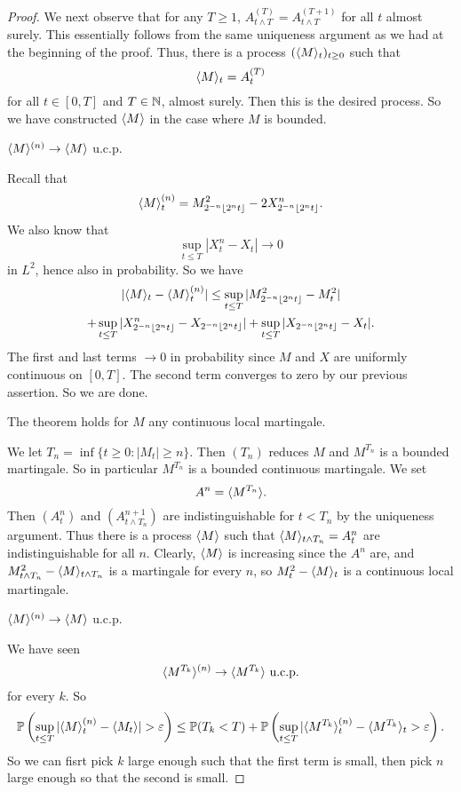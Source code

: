\documentclass[a4paper]{article}
\begin{document}
\begin{proof}
  We next observe that for any $T \geq 1$, $A_{t \wedge T}^{(T)} = A_{t \wedge T}^{(T + 1)}$ for all $t$ almost surely. This essentially follows from the same uniqueness argument as we had at the beginning of the proof. Thus, there is a process $(\langle M\rangle_t)_{t \geq 0}$ such that
  \[
    \langle M\rangle_t = A_t^{(T)}
  \]
  for all $t \in [0, T]$ and $T \in \mathbb{N}$, almost surely. Then this is the desired process. So we have constructed $\langle M\rangle$ in the case where $M$ is bounded.

  \begin{claim}
    $\langle M\rangle^{(n)} \to \langle M\rangle$ u.c.p.
  \end{claim}
  Recall that
  \[
    \langle M\rangle_t^{(n)} = M^2_{2^{-n}\lfloor 2^n t\rfloor} - 2 X^n_{2^{-n} \lfloor 2^n t\rfloor}.
  \]
  We also know that
  \[
    \sup_{t \leq T} |X_t^n - X_t| \to 0
  \]
  in $L^2$, hence also in probability. So we have
  \begin{multline*}
    |\langle M\rangle_t - \langle M\rangle^{(n)}_t| \leq \sup_{t \leq T} |M^2_{2^{-n}\lfloor 2^n t\rfloor} - M_t^2| \\
    + \sup_{t \leq T} |X^n_{2^{-n}\lfloor 2^n t\rfloor} - X_{2^{-n} \lfloor 2^n t\rfloor}| + \sup_{t \leq T} |X_{2^{-n}\lfloor 2^n t\rfloor} - X_t|.
  \end{multline*}
  The first and last terms $\to 0$ in probability since $M$ and $X$ are uniformly continuous on $[0, T]$. The second term converges to zero by our previous assertion. So we are done.

  \begin{claim}
    The theorem holds for $M$ any continuous local martingale.
  \end{claim}
  We let $T_n = \inf\{t \geq 0 : |M_t| \geq n\}$. Then $(T_n)$ reduces $M$ and $M^{T_n}$ is a bounded martingale. So in particular $M^{T_n}$ is a bounded continuous martingale. We set
  \[
    A^n = \langle M^{T_n}\rangle.
  \]
  Then $(A_t^n)$ and $(A_{t \wedge T_n}^{n + 1})$ are indistinguishable for $t < T_n$ by the uniqueness argument. Thus there is a process $\langle M\rangle$ such that $\langle M \rangle_{t \wedge T_n} = A_t^n$ are indistinguishable for all $n$. Clearly, $\langle M\rangle$ is increasing since the $A^n$ are, and $M^2_{t \wedge T_n} - \langle M\rangle_{t \wedge T_n}$ is a martingale for every $n$, so $M^2_t - \langle M\rangle_t$ is a continuous local martingale.

  \begin{claim}
    $\langle M\rangle^{(n)} \to \langle M\rangle$ u.c.p.
  \end{claim}
  We have seen
  \[
    \langle M^{T_k}\rangle^{(n)} \to \langle M^{T_k}\rangle\text{ u.c.p.}
  \]
  for every $k$. So
  \[
    \mathbb{P}\left(\sup_{t \leq T} |\langle M\rangle_t^{(n)} - \langle M_t\rangle| > \varepsilon\right) \leq \mathbb{P}(T_k < T) + \mathbb{P}\left(\sup_{t \leq T} |\langle M^{T_k}\rangle_t^{(n)} - \langle M^{T_k}\rangle_t > \varepsilon\right).
  \]
  So we can fisrt pick $k$ large enough such that the first term is small, then pick $n$ large enough so that the second is small.
\end{proof}
\end{document}
